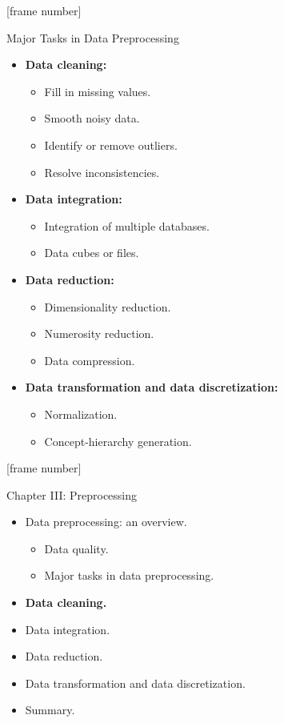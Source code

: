 \documentclass[aspectratio=169,t]{beamer}
\begin{document}
  {
    [frame number]
    \begin{frame}{Major Tasks in Data Preprocessing}
      \begin{itemize}
        \item \textbf{Data cleaning:}
        \begin{itemize}
          \item Fill in missing values.
          \item Smooth noisy data.
          \item Identify or remove outliers.
          \item Resolve inconsistencies.
        \end{itemize}
        \item \textbf{Data integration:}
        \begin{itemize}
          \item Integration of multiple databases.
          \item Data cubes or files.
        \end{itemize}
        \item \textbf{Data reduction:}
        \begin{itemize}
          \item Dimensionality reduction.
          \item Numerosity reduction.
          \item Data compression.
        \end{itemize}
        \item \textbf{Data transformation and data discretization:}
        \begin{itemize}
          \item Normalization.
          \item Concept-hierarchy generation.
        \end{itemize}
      \end{itemize}
    \end{frame}
  }

  {
    [frame number]
    \begin{frame}{Chapter III: Preprocessing}
        \begin{itemize}
            \item Data preprocessing: an overview.
            \begin{itemize}
              \item Data quality.
              \item Major tasks in data preprocessing.
            \end{itemize}
            \item \textbf{Data cleaning.}
            \item Data integration.
            \item Data reduction.
            \item Data transformation and data discretization.
            \item Summary.
        \end{itemize}
    \end{frame}
  }
\end{document}
